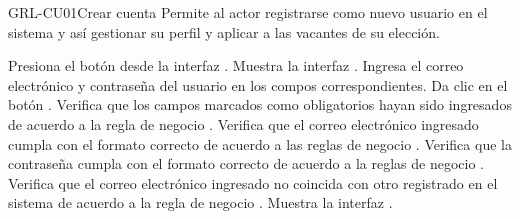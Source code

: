 \begin{UseCase}{GRL-CU01}{Crear cuenta}{
	Permite al actor registrarse como nuevo usuario en el sistema y así gestionar su perfil y aplicar a las vacantes
	de su elección.
}
	  

\end{UseCase}

\begin{UCtrayectoria}
	\UCpaso [\UCactor] Presiona el botón  desde la interfaz .
    \UCpaso [\UCsist] Muestra la interfaz .
	\UCpaso [\UCactor] Ingresa el correo electrónico y contraseña del usuario en los compos correspondientes.\label{cu01-grl}
	\UCpaso [\UCactor] Da clic en el botón . 
    \UCpaso [\UCsist] Verifica que los campos marcados como obligatorios hayan sido ingresados de acuerdo a la regla de negocio .
	\UCpaso [\UCsist] Verifica que el correo electrónico ingresado cumpla con el formato correcto de acuerdo a las reglas de negocio  .
	\UCpaso [\UCsist] Verifica que la contraseña cumpla con el formato correcto de acuerdo a la reglas de negocio .
	\UCpaso [\UCsist] Verifica que el correo electrónico ingresado no coincida con otro registrado en el sistema de acuerdo a la regla de negocio .
    \UCpaso [\UCsist] Muestra la interfaz .
\end{UCtrayectoria}

